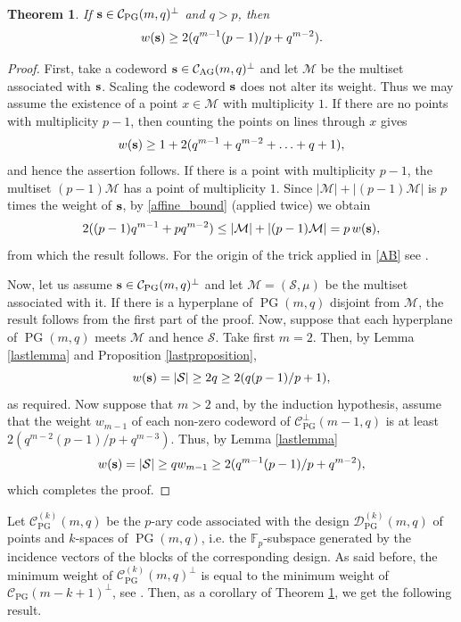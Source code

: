 \documentclass[12pt]{article}
\newcommand{\cC}{{\mathcal C}}
\newcommand{\cM}{{\mathcal M}}
\newcommand{\cS}{{\mathcal S}}
\newcommand{\F}{{\mathbb F}}
\newtheorem{theorem}{Theorem}[section]
\DeclareMathOperator{\PG}{{PG}}
\DeclareMathOperator{\AG}{{AG}}
\begin{document}
	\begin{theorem}
		\label{codebound2}
		If ${\bf s}\in \cC_{\PG}(m,q)^\perp$ and $q>p$, then
		\[ w({\bf s}) \geq 2(q^{m-1}(p-1)/p+q^{m-2}).\]
	\end{theorem}
	\begin{proof}
		First, take a codeword ${ \bf s}\in \cC_{\AG}(m,q)^\perp$ and let $\cM$ be the multiset associated with ${ \bf s}$.
		Scaling the codeword ${ \bf s}$ does not alter its weight. Thus we may assume the existence of a point  $x \in \cM$ with multiplicity $1$. If there are no points with multiplicity $p-1$, then counting the points on lines through $x$ gives
		$$w({\bf s}) \geq 1+2(q^{m-1}+q^{m-2}+\ldots+q+1),$$
		and hence the assertion follows.
		If there is a point with multiplicity $p-1$, the multiset $(p-1)\cM$ has a point of multiplicity $1$. Since $|\cM|+|(p-1)\cM|$ is $p$ times the weight of $\bf{s}$, by \eqref{affine_bound} (applied twice) we obtain
		\begin{equation}
			\label{AB}
			2((p-1)q^{m-1}+pq^{m-2})\leq |\cM|+|(p-1)\cM|=p\,w({\bf s}),\end{equation}
		from which the result follows. 
		For the origin of the trick applied in \eqref{AB} see {\cite[Result 3.2 and Remark 3.4]{adriaensen}}.
		
		Now, let us assume ${ \bf s } \in \cC_{\PG}(m,q)^{\perp}$ and  let $\cM=(\cS, \mu)$ be the multiset associated with it. If there is a hyperplane of $\PG(m,q)$ disjoint from $\cM$, the result follows from the first part of the proof. Now, suppose that each hyperplane of $\PG(m,q)$ meets $\cM$ and hence $\cS$.
		Take first $m = 2$. Then, by Lemma \ref{lastlemma} and Proposition \ref{lastproposition},
		$$w({\bf s})= \vert \cS \vert \geq 2q \geq 2 (q(p-1)/p +1),$$ as required. Now suppose that $m > 2$ and, by the induction hypothesis, assume that the weight $w_{m-1}$ of each non-zero codeword of $\cC^\perp_{\PG}(m-1,q)$ is at least $2(q^{m-2}(p-1)/p+q^{m-3})$. Thus, by Lemma \ref{lastlemma}
		\[
		w( {\bf s}) = \vert \cS \vert  \geq 
		qw_{m-1}  \geq   2(q^{m-1}(p-1)/p+q^{m-2}),
		\]
		which completes the proof. 
	\end{proof}
	
	Let $\cC^{(k)}_{\PG}(m,q)$  be the $p$-ary code associated with the design $\mathcal{D}^{(k)}_{\PG}(m,q)$ of points and $k$-spaces  of $\PG(m,q)$, i.e. the $\F_p$-subspace generated by the incidence vectors of the blocks of the corresponding design. As said before, the minimum weight of $\mathcal{C}^{(k)}_{\mathrm{PG}}(m,q)^\perp$ is equal to the minimum weight of $\mathcal{C}_{\mathrm{PG}}(m-k+1)^\perp$, see \cite[Theorem 10]{LaStoVan}. Then, as a corollary of Theorem \ref{codebound2}, we get the following result.
	
\end{document}
